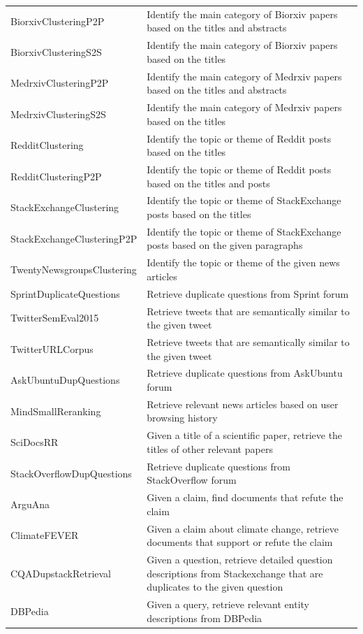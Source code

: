 \documentclass{article}
\begin{document}
\begin{longtable}{lp{9cm}}
BiorxivClusteringP2P & Identify the main category of Biorxiv papers based on the titles and abstracts \\
BiorxivClusteringS2S & Identify the main category of Biorxiv papers based on the titles \\
MedrxivClusteringP2P & Identify the main category of Medrxiv papers based on the titles and abstracts \\
MedrxivClusteringS2S & Identify the main category of Medrxiv papers based on the titles \\
RedditClustering & Identify the topic or theme of Reddit posts based on the titles \\
RedditClusteringP2P & Identify the topic or theme of Reddit posts based on the titles and posts \\
StackExchangeClustering & Identify the topic or theme of StackExchange posts based on the titles \\
StackExchangeClusteringP2P & Identify the topic or theme of StackExchange posts based on the given paragraphs \\
TwentyNewsgroupsClustering & Identify the topic or theme of the given news articles \\
\midrule
SprintDuplicateQuestions & Retrieve duplicate questions from Sprint forum \\
TwitterSemEval2015 & Retrieve tweets that are semantically similar to the given tweet \\
TwitterURLCorpus & Retrieve tweets that are semantically similar to the given tweet \\
\midrule
AskUbuntuDupQuestions & Retrieve duplicate questions from AskUbuntu forum \\
MindSmallReranking & Retrieve relevant news articles based on user browsing history \\
SciDocsRR & Given a title of a scientific paper, retrieve the titles of other relevant papers \\
StackOverflowDupQuestions & Retrieve duplicate questions from StackOverflow forum \\
\midrule
ArguAna & Given a claim, find documents that refute the claim \\
ClimateFEVER & Given a claim about climate change, retrieve documents that support or refute the claim \\
CQADupstackRetrieval & Given a question, retrieve detailed question descriptions from Stackexchange that are duplicates to the given question \\
DBPedia & Given a query, retrieve relevant entity descriptions from DBPedia \\

\end{longtable}
\end{document}

